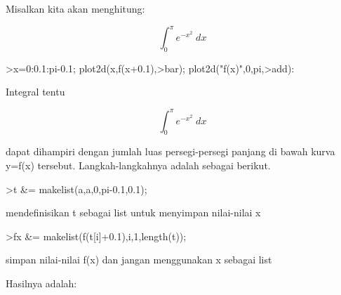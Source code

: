 \documentclass[a4paper,10pt]{article}
\begin{document}
\begin{eulernotebook}
\begin{eulercomment}
\begin{eulercomment}
\begin{eulercomment}
\begin{eulercomment}
\begin{eulercomment}
Misalkan kita akan menghitung:

\end{eulercomment}
\begin{eulerformula}
\[
\int_{0}^{\pi}{e^ {- x^2 }\;dx}
\]
\end{eulerformula}
\begin{eulerprompt}
>x=0:0.1:pi-0.1; plot2d(x,f(x+0.1),>bar); plot2d("f(x)",0,pi,>add):
\end{eulerprompt}
\begin{eulercomment}
Integral tentu

\end{eulercomment}
\begin{eulerformula}
\[
\int_{0}^{\pi}{e^ {- x^2 }\;dx}
\]
\end{eulerformula}
\begin{eulercomment}
dapat dihampiri dengan jumlah luas persegi-persegi panjang di bawah
kurva y=f(x) tersebut. Langkah-langkahnya adalah sebagai berikut.
\end{eulercomment}
\begin{eulerprompt}
>t &= makelist(a,a,0,pi-0.1,0.1);
\end{eulerprompt}
\begin{eulerttcomment}
 mendefinisikan t sebagai list untuk menyimpan nilai-nilai x
\end{eulerttcomment}
\begin{eulerprompt}
>fx &= makelist(f(t[i]+0.1),i,1,length(t)); 
\end{eulerprompt}
\begin{eulercomment}
simpan nilai-nilai f(x) dan jangan menggunakan x sebagai list

Hasilnya adalah:


\end{eulercomment}
\end{eulercomment}
\end{eulercomment}
\end{eulercomment}
\end{eulercomment}
\end{eulernotebook}
\end{document}
